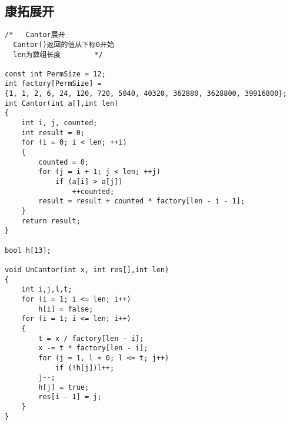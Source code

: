 \subsection{康拓展开}
	\begin{verbatim}
/*   Cantor展开   
  Cantor()返回的值从下标0开始
  len为数组长度        */

const int PermSize = 12;
int factory[PermSize] =
{1, 1, 2, 6, 24, 120, 720, 5040, 40320, 362880, 3628800, 39916800};
int Cantor(int a[],int len)
{
    int i, j, counted;
    int result = 0;
    for (i = 0; i < len; ++i)
    {
        counted = 0;
        for (j = i + 1; j < len; ++j)
            if (a[i] > a[j])
                ++counted;
        result = result + counted * factory[len - i - 1];
    }
    return result;
}

bool h[13];

void UnCantor(int x, int res[],int len)
{
    int i,j,l,t;
    for (i = 1; i <= len; i++)
        h[i] = false;
    for (i = 1; i <= len; i++)
    {
        t = x / factory[len - i];
        x -= t * factory[len - i];
        for (j = 1, l = 0; l <= t; j++)
            if (!h[j])l++;
        j--;
        h[j] = true;
        res[i - 1] = j;
    }
}
	\end{verbatim}
